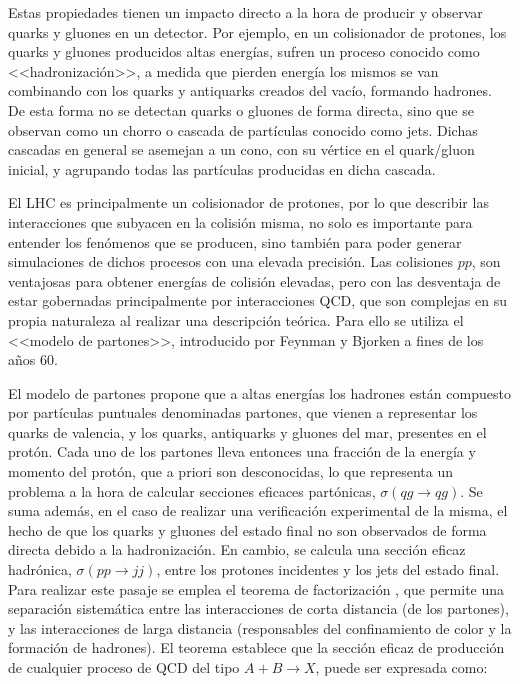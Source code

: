 Estas propiedades tienen un impacto directo a la hora de producir y observar quarks y gluones en un detector. Por ejemplo, en un colisionador de protones, los quarks y
gluones producidos altas energías, sufren un proceso conocido como <<hadronización>>,
a medida que pierden energía los mismos se van combinando con los quarks y antiquarks creados del vacío, formando hadrones. De esta forma no se detectan quarks o gluones de forma directa, sino que se observan como un chorro o cascada de partículas conocido como jets. Dichas cascadas en general se asemejan a un cono, con su vértice en el quark/gluon inicial, y agrupando todas las partículas producidas en dicha cascada. 




El LHC es principalmente un colisionador de protones, por lo que describir las interacciones que subyacen en la colisión misma, no solo es importante para entender los fenómenos que se producen, sino también para poder generar simulaciones de dichos procesos con una elevada precisión. Las colisiones $pp$, son ventajosas para obtener energías de colisión elevadas, pero con las desventaja de estar gobernadas principalmente por interacciones QCD, que son complejas en su propia naturaleza al realizar una descripción teórica. Para ello se utiliza el <<modelo de partones>>, introducido por Feynman \cite{PhysRevLett.23.1415} y Bjorken \cite{PhysRev.185.1975} a fines de los años 60. 

El modelo de partones propone que a altas energías los hadrones están compuesto por partículas puntuales denominadas partones, que vienen a representar los quarks de valencia, y los quarks, antiquarks y gluones del mar, presentes en el protón. Cada uno de los partones lleva entonces una fracción de la energía y momento del protón, que a priori son desconocidas, lo que representa un problema a la hora de calcular secciones eficaces partónicas, $\sigma(qg\to qg)$.
Se suma además, en el caso de realizar una verificación experimental de la misma, el hecho de que los quarks y gluones del estado final no son observados de forma directa debido a la hadronización. En cambio, se calcula una sección eficaz hadrónica, $\sigma(pp\to jj)$, entre los protones incidentes y los jets del estado final. Para realizar este pasaje se emplea el teorema de factorización \cite{ELLIS1978281}, que permite una separación sistemática
entre las interacciones de corta distancia (de los partones), y las interacciones de larga distancia (responsables del confinamiento de color y la formación de hadrones). El teorema establece que la sección eficaz de producción de cualquier proceso de QCD del tipo $A+B\to X$, puede ser expresada como:





